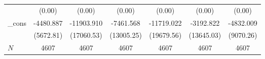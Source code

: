 {\begin{tabular}{l*{6}{c}}
            &                   (0.00)         &                   (0.00)         &                   (0.00)         &                   (0.00)         &                   (0.00)         &                   (0.00)         \\
\_cons      &                -4480.887         &               -11903.910         &                -7461.568         &               -11719.022         &                -3192.822         &                -4832.009         \\
            &                (5672.81)         &               (17060.53)         &               (13005.25)         &               (19679.56)         &               (13645.03)         &                (9070.26)         \\
\hline
\(N\)       &                     4607         &                     4607         &                     4607         &                     4607         &                     4607         &                     4607         \\
\hline\hline
\end{tabular}
}
